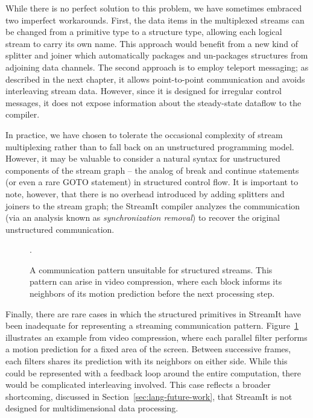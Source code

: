   While there is no perfect solution to this problem, we have
  sometimes embraced two imperfect workarounds.  First, the data items
  in the multiplexed streams can be changed from a primitive type to a
  structure type, allowing each logical stream to carry its own name.
  This approach would benefit from a new kind of splitter and joiner
  which automatically packages and un-packages structures from
  adjoining data channels.  The second approach is to employ teleport
  messaging; as described in the next chapter, it allows
  point-to-point communication and avoids interleaving stream data.
  However, since it is designed for irregular control messages, it
  does not expose information about the steady-state dataflow to the
  compiler.

  In practice, we have chosen to tolerate the occasional complexity of
  stream multiplexing rather than to fall back on an unstructured
  programming model.  However, it may be valuable to consider a
  natural syntax for unstructured components of the stream graph --
  the analog of break and continue statements (or even a rare GOTO
  statement) in structured control flow. It is important to note,
  however, that there is no overhead introduced by adding splitters
  and joiners to the stream graph; the StreamIt compiler analyzes the
  communication (via an analysis known as {\it synchronization
  removal}) to recover the original unstructured communication.

\begin{figure}[t]
\centering
{}

\caption[A communication pattern unsuitable for structured streams.]{A
  communication pattern unsuitable for structured streams.  This
  pattern can arise in video compression, where each block informs its
  neighbors of its motion prediction before the next processing
  step.\protect\label{fig:inadequate}}.
\end{figure}

  Finally, there are rare cases in which the structured primitives in
  StreamIt have been inadequate for representing a streaming
  communication pattern.  Figure~\ref{fig:inadequate} illustrates an
  example from video compression, where each parallel filter performs
  a motion prediction for a fixed area of the screen.  Between
  successive frames, each filters shares its prediction with its
  neighbors on either side.  While this could be represented with a
  feedback loop around the entire computation, there would be
  complicated interleaving involved.  This case reflects a broader
  shortcoming, discussed in Section~\ref{sec:lang-future-work}, that
  StreamIt is not designed for multidimensional data processing.

